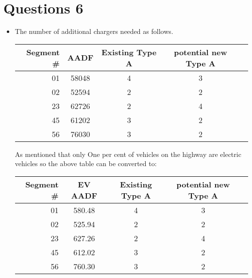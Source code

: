 \documentclass[12pt,letterpaper]{article}
\begin{document}
\newpage
\section*{Questions 6}
\begin{itemize}
    \item The number of additional chargers needed as follows.
        \begin{center}
            \begin{tabular}{r|cccc}
                 Segment \# & AADF & Existing Type A & potential new Type A \\ \hline
                 01 & 58048 & 4 & 3  \\
                 02 & 52594 & 2 & 2  \\ 
                 23 & 62726 & 2 & 4  \\
                 45 & 61202 & 3 & 2  \\
                 56 & 76030 & 3 & 2  \\
            \end{tabular}
        \end{center}
        
        As mentioned that only One per cent of vehicles on the highway are electric vehicles so the above table can be converted to: \\
        \begin{center}
            \begin{tabular}{r|cccc}
                 Segment \# & EV AADF & Existing Type A & potential new Type A \\ \hline
                 01 & 580.48 & 4 & 3  \\
                 02 & 525.94 & 2 & 2  \\ 
                 23 & 627.26 & 2 & 4  \\
                 45 & 612.02 & 3 & 2  \\
                 56 & 760.30 & 3 & 2  \\
            \end{tabular}
        \end{center}
        

\end{itemize}
\end{document}
